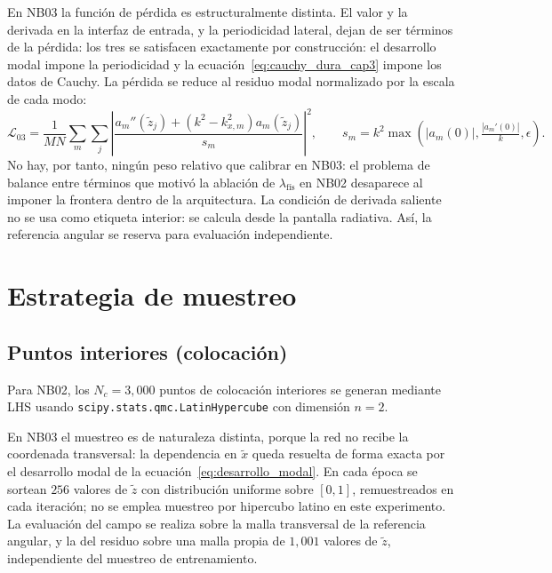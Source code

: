 En NB03 la función de pérdida es estructuralmente distinta. El valor y la
derivada en la interfaz de entrada, y la periodicidad lateral, dejan de ser
términos de la pérdida: los tres se satisfacen exactamente por construcción: el desarrollo modal impone la periodicidad y la ecuación~\eqref{eq:cauchy_dura_cap3} impone los datos de Cauchy. La pérdida se reduce al residuo modal normalizado
por la escala de cada modo:
%
\begin{equation}
    \mathcal{L}_{03} = \frac{1}{M N}\sum_{m}\sum_{j}
    \left\lvert
    \frac{a_m''(\tilde z_j)+\left(k^2-k_{x,m}^2\right)a_m(\tilde z_j)}{s_m}
    \right\rvert^{2},
    \qquad
    s_m=k^2\max\!\left(|a_m(0)|,\tfrac{|a_m'(0)|}{k},\epsilon\right).
    \label{eq:loss_nb03}
\end{equation}
%
No hay, por tanto, ningún peso relativo que calibrar en NB03: el problema de
balance entre términos que motivó la ablación de $\lambda_\text{fís}$ en NB02
desaparece al imponer la frontera dentro de la arquitectura. La condición de
derivada saliente no se usa como etiqueta interior: se calcula desde la
pantalla radiativa. Así, la referencia angular se
reserva para evaluación independiente.

\section{Estrategia de muestreo}

\subsection{Puntos interiores (colocación)}

Para NB02, los $N_c = 3{,}000$ puntos de colocación interiores se generan
mediante LHS \parencite{mckay1979lhs} usando
\texttt{scipy.stats.qmc.LatinHypercube} con dimensión $n = 2$.

En NB03 el muestreo es de naturaleza distinta, porque la red no recibe la
coordenada transversal: la dependencia en $\tilde x$ queda resuelta de forma
exacta por el desarrollo modal de la
ecuación~\eqref{eq:desarrollo_modal}. En cada época se sortean $256$ valores
de $\tilde z$ con distribución uniforme sobre $[0,1]$, remuestreados en cada
iteración; no se emplea muestreo por hipercubo latino en este experimento. La
evaluación del campo se realiza sobre la malla transversal de la referencia
angular, y la del residuo sobre una malla propia de $1{,}001$ valores de
$\tilde z$, independiente del muestreo de entrenamiento.

